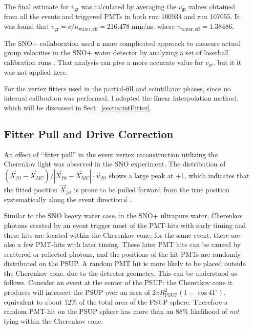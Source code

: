 The final estimate for $v_\mathrm{gr}$ was calculated by averaging the $v_\mathrm{gr}$ values obtained from all the events and triggered PMTs in both run 100934 and run 107055. It was found that $v_\mathrm{gr}=c/n_\mathrm{water,eff}=216.478$ mm/ns, where $n_\mathrm{water,eff}=1.38486$.

The SNO+ collaboration used a more complicated approach to measure actual group velocities in the SNO+ water detector by analyzing a set of laserball calibration runs \cite{anderson2021optical,groupVmeasure}. That analysis can give a more accurate value for $v_\mathrm{gr}$, but it it was not applied here.

For the vertex fitters used in the partial-fill and scintillator phases, since no internal calibration was performed, I adopted the linear interpolation method, which will be discussed in Sect.~\ref{sect:scintFitter}.

\subsection{Fitter Pull and Drive Correction}\label{sect:fitterPull}

An effect of ``fitter pull'' in the event vertex reconstruction utilizing the Cherenkov light was observed in the SNO experiment. The distribution of $(\vec{X}_{fit}-\vec{X}_{MC})/|\vec{X}_{fit}-\vec{X}_{MC}|\cdot \vec{u}_{fit}$ shows a large peak at +1, which indicates that the fitted position $\vec{X}_{fit}$ is prone to be pulled forward from the true position systematically along the event direction$\vec{u}$ \cite{driveCorPeter,brice1996monte,coulter2013modelling}. 

Similar to the SNO heavy water case, in the SNO+ ultrapure water, Cherenkov photons created by an event trigger most of the PMT-hits with early timing and these hits are located within the Cherenkov cone; for the same event, there are also a few PMT-hits with later timing. These later PMT hits can be caused by scattered or reflected photons, and the positions of the hit PMTs are randomly distributed on the PSUP. A random PMT hit is more likely to be placed outside the Cherenkov cone, due to the detector geometry. This can be understood as follows. Consider an event at the center of the PSUP: the Cherenkov cone it produces will intersect the PSUP over an area of $2\pi R^2_\mathrm{PSUP}(1-\cos41^\circ)$, equivalent to about 12\% of the total area of the PSUP sphere. Therefore a random PMT-hit on the PSUP sphere has more than an 88\% likelihood of {\em not} lying within the Cherenkov cone. 

